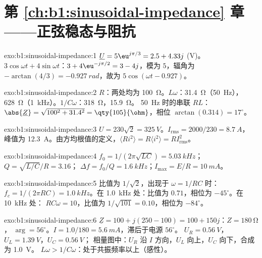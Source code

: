 \section*{第 \ref{ch:b1:sinusoidal-impedance} 章——正弦稳态与阻抗}

\begin{solution}{exo:b1:sinusoidal-impedance:1}
$\underline U = 5\eu^{j\pi/3} = 2.5 + 4.33j$ (V)。$3\cos\omega t +
4\sin\omega t$：$3 + 4\eu^{-j\pi/2} = 3 - 4j$，模为 $5$，辐角为
$-\arctan(4/3) = \qty{-0.927}{rad}$，故为 $5\cos(\omega t - 0.927)$。
\end{solution}

\begin{solution}{exo:b1:sinusoidal-impedance:2}
$R$：两处均为 \qty{100}{\ohm}。$L\omega$：\qty{31.4}{\ohm}（\qty{50}{Hz}），
\qty{628}{\ohm}（\qty{1}{kHz}）。$1/C\omega$：\qty{318}{\ohm}，\qty{15.9}{\ohm}。
\qty{50}{Hz} 时的串联 $RL$：$\abs{\underline Z} = \sqrt{100^2 + 31.4^2} =
\qty{105}{\ohm}$，相位 $\arctan(0.314) = 17^\circ$。
\end{solution}

\begin{solution}{exo:b1:sinusoidal-impedance:3}
$U = 230\sqrt2 = \qty{325}{V}$。$I_{\mathrm{rms}} = 2000/230 = \qty{8.7}{A}$，
峰值为 \qty{12.3}{A}。由方均根值的定义，$\langle Ri^2\rangle = R\langle i^2\rangle =
RI_{\mathrm{rms}}^2$。
\end{solution}

\begin{solution}{exo:b1:sinusoidal-impedance:4}
$f_0 = 1/(2\pi\sqrt{LC}) = \qty{5.03}{kHz}$；$Q = \sqrt{L/C}/R = 3.16$；
$\Delta f = f_0/Q = \qty{1.6}{kHz}$；$I_{\max} = E/R = \qty{10}{mA}$。
\end{solution}

\begin{solution}{exo:b1:sinusoidal-impedance:5}
比值为 $1/\sqrt2$，出现于 $\omega = 1/RC$ 时：$f_c = 1/(2\pi RC) = \qty{1.0}{kHz}$。在
\qty{1.0}{kHz} 处：比值为 $0.71$，相位为 $-45^\circ$。在 \qty{10}{kHz} 处：
$RC\omega = 10$，比值为 $1/\sqrt{101} = 0.10$，相位为 $-84^\circ$。
\end{solution}

\begin{solution}{exo:b1:sinusoidal-impedance:6}
$\underline Z = 100 + j(250 - 100) = 100 + 150j$：$Z = \qty{180}{\ohm}$，
$\arg = 56^\circ$。$I = 1.0/180 = \qty{5.6}{mA}$，滞后于电源 $56^\circ$。
$U_R = \qty{0.56}{V}$，$U_L = \qty{1.39}{V}$，$U_C = \qty{0.56}{V}$；
相量图中：$U_R$ 沿 $I$ 方向，$U_L$ 向上，$U_C$ 向下，合成为 \qty{1.0}{V}。
$L\omega > 1/C\omega$：处于共振频率以上（感性）。
\end{solution}

